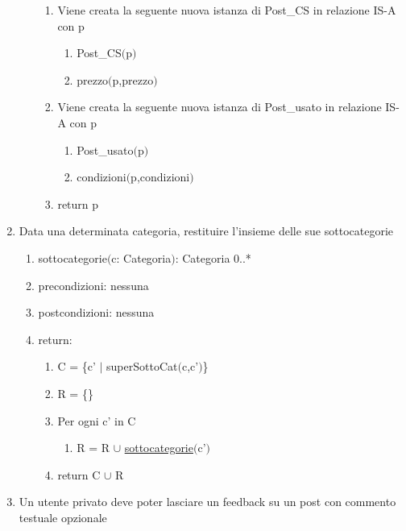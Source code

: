 \documentclass{article}
\begin{document}
\begin{enumerate}
\begin{enumerate}
\begin{enumerate}
            \item Viene creata la seguente nuova istanza di Post\_CS in relazione IS-A con p
            \begin{enumerate}
                \item Post\_CS$($p$)$
                \item prezzo$($p,prezzo$)$
            \end{enumerate}
            \item Viene creata la seguente nuova istanza di Post\_usato in relazione IS-A con p
            \begin{enumerate}
                \item Post\_usato$($p$)$
                \item condizioni$($p,condizioni$)$
            \end{enumerate}
            \item return p
        \end{enumerate}
    \end{enumerate}
    \newpage
    \item\label{sec:sottocategorie} Data una determinata categoria, restituire l'insieme delle sue sottocategorie
    \begin{enumerate}
        \item sottocategorie$($c: Categoria$)$: Categoria 0..*
        \item precondizioni: nessuna
        \item postcondizioni: nessuna
        \item return:
        \begin{enumerate}
            \item C = \{c' $|$ superSottoCat$($c,c'$)$\}
            \item R = \{\}
            \item Per ogni c' in C
            \begin{enumerate}
                \item R = R $\cup$ \hyperref[sec:sottocategorie]{sottocategorie}$($c'$)$
            \end{enumerate}
            \item return C $\cup$ R
        \end{enumerate}
    \end{enumerate}
    \newpage
    \item\label{sec:lasciaFeedback} Un utente privato deve poter lasciare un feedback su un post con commento testuale opzionale
    \begin{enumerate}

\end{enumerate}
\end{enumerate}
\end{document}
